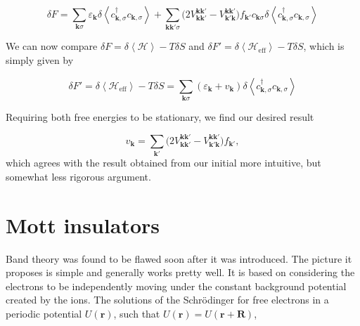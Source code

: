 \begin{equation}
\delta F = \sum_{\bm k \sigma} \varepsilon_{\bm k} \delta \left\langle c_{\bm k, \sigma}^\dagger c_{\bm k, \sigma} \right\rangle + \sum_{\bm k \bm k' \sigma} \bigg( 2 V_{\bm k \bm k'}^{\bm k \bm k'} -  V_{\bm k' \bm k}^{\bm k \bm k'}  \bigg) f_{\bm k'} c_{\bm k \sigma} \delta \left\langle c_{\bm k, \sigma}^\dagger c_{\bm k, \sigma} \right\rangle
\end{equation}

We can now compare $\delta F = \delta \left\langle \mathcal{H} \right\rangle - T \delta S$ and $\delta F' = \delta \left\langle \mathcal{H}_{\text{eff}} \right\rangle - T \delta S$, which is simply given by

\begin{equation}
\delta F' =  \delta \left\langle \mathcal{H}_{\text{eff}} \right\rangle - T \delta S = \sum_{\bm k \sigma} (\varepsilon_{\bm k} + v_{\bm k}) \delta \left\langle c_{\bm k, \sigma}^\dagger c_{\bm k, \sigma} \right\rangle
\end{equation}

Requiring both free energies to be stationary, we find our desired result

\begin{equation}
v_{\bm k} = \sum_{\bm k'} \bigg( 2 V_{\bm k \bm k'}^{\bm k \bm k'} -  V_{\bm k' \bm k}^{\bm k \bm k'}  \bigg) f_{\bm k'} ,
\end{equation}
which agrees with the result obtained from our initial more intuitive, but somewhat less rigorous  argument.

\section{Mott insulators}\label{sec:mott}

Band theory was found to be flawed soon after it was introduced.
The picture it proposes is simple and generally works pretty well.
It is based on considering the electrons to be independently moving under the constant background potential created by the ions.
The solutions of the Schr\"odinger for free electrons in a periodic potential $U(\bm r)$, such that $U(\bm r) = U(\bm r + \bm R)$,

